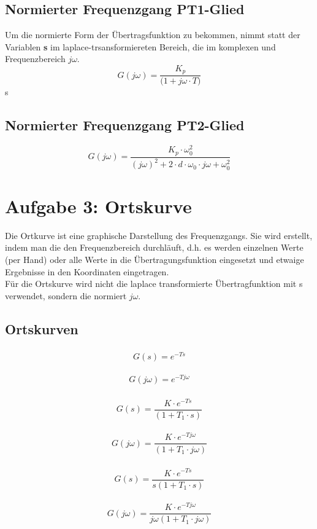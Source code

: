 \documentclass{article}
\begin{document}
		\subsection{Normierter Frequenzgang PT1-Glied}
			Um die normierte Form der Übertragsfunktion zu bekommen, nimmt statt der Variablen \textbf{s} im laplace-trsansformiereten Bereich, die im komplexen und Frequenzbereich $j\omega$. 
			$$G(j\omega) = \frac{K_p}{\Big(1 + j\omega \cdot T\Big)}$$
			s
		\subsection{Normierter Frequenzgang PT2-Glied}
			$$G(j\omega) = \frac{K_p \cdot \omega_0^2}{(j\omega)^2 + 2\cdot d\cdot \omega_0 \cdot j\omega + \omega_0^2}$$
	\newpage	
	\section{Aufgabe 3: Ortskurve}
		Die Ortkurve ist eine graphische Darstellung des Frequenzgangs. Sie wird erstellt, indem man die den Frequenzbereich durchläuft, d.h. es werden einzelnen Werte (per Hand) oder alle Werte in die Übertragungsfunktion eingesetzt und etwaige Ergebnisse in den Koordinaten eingetragen.\\
		Für die Ortskurve wird nicht die laplace transformierte Übertragfunktion mit s verwendet, sondern die normiert $j\omega$.
	
		\subsection{Ortskurven}
			\subsubsection{}
				$$G(s) = e^{-Ts}$$
				\\
				$$G(j\omega) = e^{-Tj\omega}$$
			\subsubsection{}
				$$G(s) = \frac{K\cdot e^{-Ts}}{(1+T_1\cdot s)}$$
				\\
				$$G(j\omega) = \frac{K\cdot e^{-Tj\omega}}{(1+T_1\cdot j\omega)}$$
			\subsubsection{}
				$$G(s) = \frac{K\cdot e^{-Ts}}{s(1+T_1\cdot s)}$$
				\\
				$$G(j\omega) = \frac{K\cdot e^{-Tj\omega}}{j\omega(1+T_1\cdot j\omega)}$$
\end{document}
